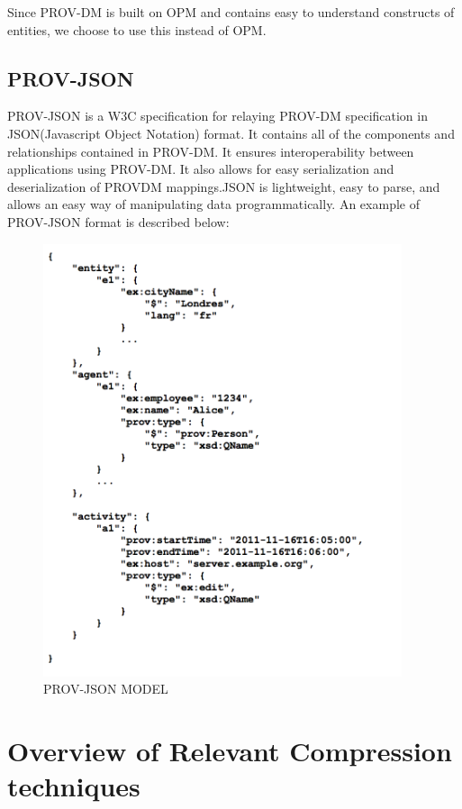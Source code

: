 Since PROV-DM is built on OPM and contains easy to understand constructs of entities, we choose to use this instead of OPM. 

\subsection{PROV-JSON}

PROV-JSON is a W3C specification for relaying PROV-DM specification in JSON(Javascript Object Notation) format. It contains all of the components and relationships contained in PROV-DM. It ensures interoperability between applications using PROV-DM. It also allows for easy serialization and deserialization of PROV\-DM mappings.JSON is lightweight, easy to parse, and allows an easy way of manipulating data programmatically. An example of PROV-JSON format is described below:

\begin{figure}[h]
\begin{center}

\includegraphics[height=5in]{prov_json.png}
\end{center}
\caption{PROV-JSON MODEL}

\end{figure}



\section{Overview of Relevant Compression techniques}


